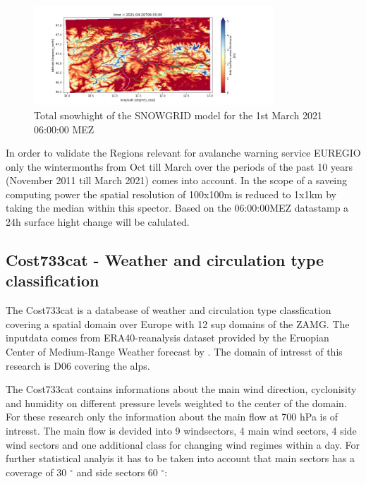  \begin{figure}[h]
    \centering
    \includegraphics[width=0.8\textwidth]{Figures/figures_methods/snowgrid.jpg}
    \caption{Total snowhight of the SNOWGRID model for the 1st March 2021 06:00:00 MEZ}
    \label{fig:snowgrid}
\end{figure}

\noindent In order to validate the Regions relevant for avalanche warning service EUREGIO only the wintermonths from Oct till March 
over the periods of the past 10 years (November 2011 till March 2021) comes into account. In the scope of a saveing computing 
power the spatial resolution of 100x100m is reduced to 1x1km by taking the median within this spector. 
Based on the 06:00:00MEZ datastamp a 24h surface hight change will be calulated.


\subsection{Cost733cat - Weather and circulation type classification}
\label{sec:wetterlagenkat}
The Cost733cat is a databease of weather and circulation type classfication covering a spatial domain over Europe with 
12 sup domains of the ZAMG. The inputdata comes from ERA40-reanalysis dataset provided by the Eruopian Center of Medium-Range
Weather forecast by \textcite{philippCost733catDatabaseWeather2010}. The domain of intresst of this research is D06 covering
the alps. 

\noindent The Cost733cat contains informations about the main wind direction, cyclonisity and humidity on different pressure levels
weighted to the center of the domain. For these research only the information about the main flow at 700 hPa is of intresst.
The main flow is devided into 9 windsectors, 4 main wind sectors, 4 side wind sectors and one additional class for changing 
wind regimes within a day. For further statistical analyis it has to be taken into account that main sectors has a coverage of
30 $^{\circ}$ and side sectors 60 $^{\circ}$:
\\

